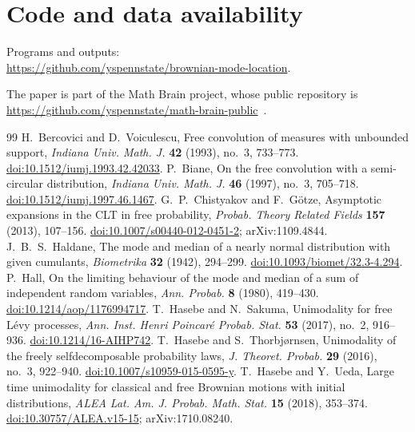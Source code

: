 \documentclass[11pt]{amsart}
\theoremstyle{definition}
\begin{document}
\section*{Code and data availability}
Programs and outputs:\\
\url{https://github.com/yspennstate/brownian-mode-location}.

The paper is part of the Math Brain project, whose public repository is
\url{https://github.com/yspennstate/math-brain-public}~\cite{MathBrainRepo}.

\begin{thebibliography}{99}
 H.~Bercovici and D.~Voiculescu, Free convolution of measures with unbounded support, \emph{Indiana Univ.
Math. J.} \textbf{42} (1993), no.~3, 733--773.
\href{https://doi.org/10.1512/iumj.1993.42.42033}{doi:10.1512/iumj.1993.42.42033}.
 P.~Biane, On the free convolution with a semi-circular distribution, \emph{Indiana Univ. Math. J.}
\textbf{46} (1997), no.~3, 705--718.
\href{https://doi.org/10.1512/iumj.1997.46.1467}{doi:10.1512/iumj.1997.46.1467}.
 G.~P.~Chistyakov and F.~G\"otze, Asymptotic expansions in the CLT in free probability, \emph{Probab.
Theory Related Fields} \textbf{157} (2013), 107--156.
\href{https://doi.org/10.1007/s00440-012-0451-2}{doi:10.1007/s00440-012-0451-2}; arXiv:1109.4844.
 J.~B.~S.~Haldane, The mode and median of a nearly normal distribution with given cumulants,
\emph{Biometrika} \textbf{32} (1942), 294--299.
\href{https://doi.org/10.1093/biomet/32.3-4.294}{doi:10.1093/biomet/32.3-4.294}.
 P.~Hall, On the limiting behaviour of the mode and median of a sum of independent random variables,
\emph{Ann. Probab.} \textbf{8} (1980), 419--430.
\href{https://doi.org/10.1214/aop/1176994717}{doi:10.1214/aop/1176994717}.
 T.~Hasebe and N.~Sakuma, Unimodality for free L\'evy processes, \emph{Ann. Inst. Henri Poincar\'e
Probab. Stat.} \textbf{53} (2017), no.~2, 916--936.
\href{https://doi.org/10.1214/16-AIHP742}{doi:10.1214/16-AIHP742}.
 T.~Hasebe and S.~Thorbj\o rnsen, Unimodality of the freely selfdecomposable probability laws, \emph{J.
Theoret. Probab.} \textbf{29} (2016), no.~3, 922--940.
\href{https://doi.org/10.1007/s10959-015-0595-y}{doi:10.1007/s10959-015-0595-y}.
 T.~Hasebe and Y.~Ueda, Large time unimodality for classical and free Brownian motions with initial
distributions, \emph{ALEA Lat. Am. J. Probab. Math. Stat.} \textbf{15} (2018), 353--374.
\href{https://doi.org/10.30757/ALEA.v15-15}{doi:10.30757/ALEA.v15-15}; arXiv:1710.08240.

\end{thebibliography}
\end{document}
